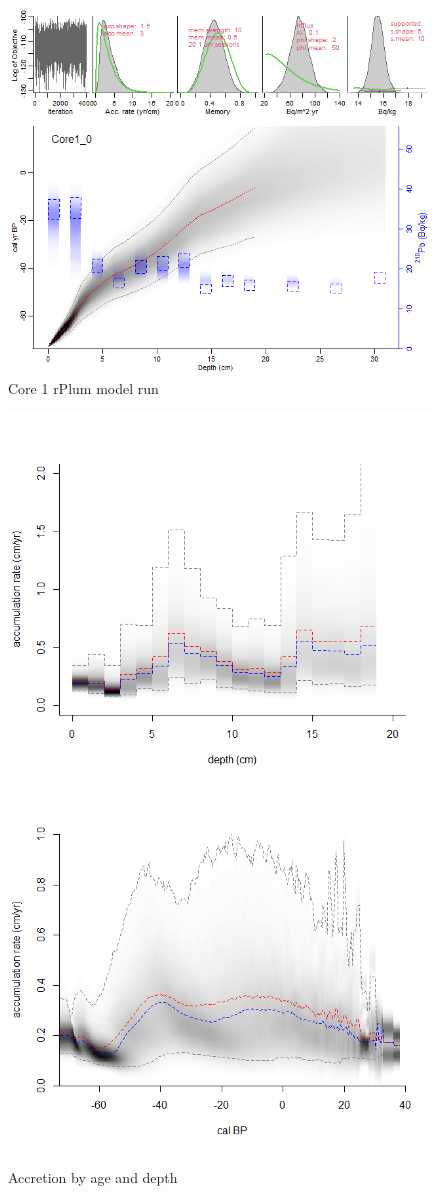 \documentclass[
  12pt,
]{article}
\begin{document}
\begin{figure}
\centering
\includegraphics{c01_rplumplot_accmean3.png}
\caption{Core 1 rPlum model run}
\end{figure}

\begin{figure}
\includegraphics[width=0.5\linewidth]{c01_accdepth_accmean3} \includegraphics[width=0.5\linewidth]{c01_accage_accmean3} \caption{Accretion by age and depth}\label{fig:agedepth1}
\end{figure}
\end{document}
